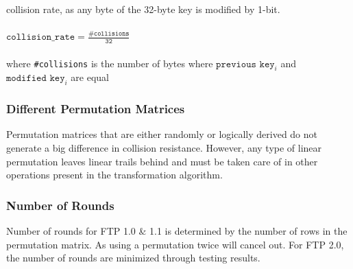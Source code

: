 \documentclass[11pt]{article}
\theoremstyle{definition}
\theoremstyle{remark}
\begin{document}
collision rate, as any byte of the 32-byte key is modified by 1-bit.
\\\\
$\texttt{collision\_rate} = \frac{\texttt{\#collisions}}{\texttt{32}}$\\
 \\ where \texttt{\#collisions} is the number of bytes where $\texttt{previous key}_i$ and $\texttt{modified key}_i$ are equal

\subsubsection{Different Permutation Matrices}

Permutation matrices that are either randomly or logically derived do not generate a big difference in collision resistance. However, any type of linear permutation leaves linear trails behind and must be taken care of in other operations present in the transformation algorithm.

\subsubsection{Number of Rounds}

Number of rounds for FTP 1.0 \& 1.1 is determined by the number of rows in the permutation matrix. As using a permutation twice will cancel out. For FTP 2.0, the number of rounds are minimized through testing results.

%
\end{document}
